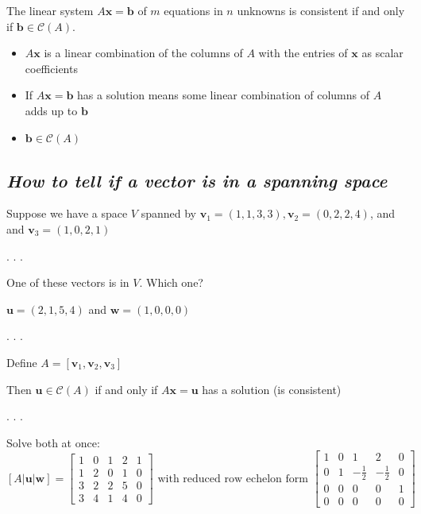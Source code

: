 \documentclass[
  letterpaper,
  DIV=11,
  numbers=noendperiod]{scrartcl}
\providecommand{\tightlist}{%
  \setlength{\itemsep}{0pt}\setlength{\parskip}{0pt}}\usepackage{longtable,booktabs,array}
\begin{document}
The linear system \(A \mathbf{x}=\mathbf{b}\) of \(m\) equations in
\(n\) unknowns is consistent if and only if
\(\mathbf{b} \in \mathcal{C}(A)\).

\begin{itemize}
\tightlist
\item
  \(A \mathbf{x}\) is a linear combination of the columns of \(A\) with
  the entries of \(\mathbf{x}\) as scalar coefficients
\item
  If \(A \mathbf{x}=\mathbf{b}\) has a solution means some linear
  combination of columns of \(A\) adds up to \(\mathbf{b}\)
\item
  \(\mathbf{b} \in \mathcal{C}(A)\)
\end{itemize}

\subsection{\texorpdfstring{\emph{How to tell if a vector is in a
spanning
space}}{How to tell if a vector is in a spanning space}}\label{how-to-tell-if-a-vector-is-in-a-spanning-space}

Suppose we have a space \(V\) spanned by
\(\mathbf{v}_{1}=(1,1,3,3), \mathbf{v}_{2}=(0,2,2,4)\), and and
\(\mathbf{v}_{3}=(1,0,2,1)\)

. . .

One of these vectors is in \(V\). Which one?

\(\mathbf{u}=(2,1,5,4)\) and \(\mathbf{w}=(1,0,0,0)\)

. . .

Define \(A=\left[\mathbf{v}_{1}, \mathbf{v}_{2}, \mathbf{v}_{3}\right]\)

Then \(\mathbf{u} \in \mathcal{C}(A)\) if and only if
\(A \mathbf{x}=\mathbf{u}\) has a solution (is consistent)

. . .

Solve both at once: \[
[A|\mathbf{u}| \mathbf{w}]=\left[\begin{array}{lllll}
1 & 0 & 1 & 2 & 1 \\
1 & 2 & 0 & 1 & 0 \\
3 & 2 & 2 & 5 & 0 \\
3 & 4 & 1 & 4 & 0
\end{array}\right] \text { with reduced row echelon form }\left[\begin{array}{rrrrr}
1 & 0 & 1 & 2 & 0 \\
0 & 1 & -\frac{1}{2} & -\frac{1}{2} & 0 \\
0 & 0 & 0 & 0 & 1 \\
0 & 0 & 0 & 0 & 0
\end{array}\right]
\]
\end{document}
